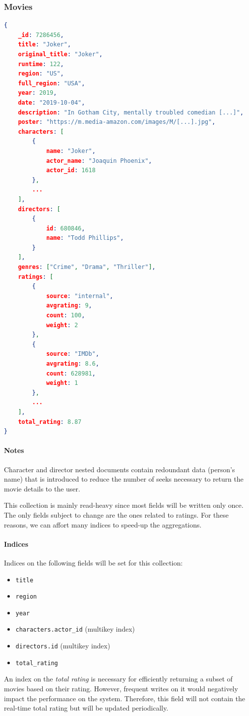 \documentclass[11pt]{article}
\begin{document}
\subsubsection{Movies}
\label{sec:movies}

\begin{lstlisting}[language=json]	
{
	_id: 7286456,
	title: "Joker",
	original_title: "Joker",
	runtime: 122,
	region: "US",
	full_region: "USA",
	year: 2019,
	date: "2019-10-04",
	description: "In Gotham City, mentally troubled comedian [...]",
	poster: "https://m.media-amazon.com/images/M/[...].jpg",
	characters: [
		{
			name: "Joker",
			actor_name: "Joaquin Phoenix",
			actor_id: 1618
		},
		...
	],
	directors: [
		{
			id: 680846,
			name: "Todd Phillips",
		}
	],
	genres: ["Crime", "Drama", "Thriller"],
	ratings: [
		{
			source: "internal",
			avgrating: 9,
			count: 100,
			weight: 2
		},
		{
			source: "IMDb",
			avgrating: 8.6,
			count: 628981,
			weight: 1
		},
		...
	],
	total_rating: 8.87
}
\end{lstlisting}

\paragraph{Notes}
Character and director nested documents contain redoundant data (person's name) that is introduced to reduce the number of seeks necessary to return the movie details
to the user.

This collection is mainly read-heavy since most fields will be written only once.
The only fields subject to change are the ones related to ratings. For these reasons,
we can affort many indices to speed-up the aggregations.

\paragraph{Indices} 
Indices on the following fields will be set for this collection:
\begin{itemize}
	\item \texttt{title}
	\item \texttt{region}
	\item \texttt{year}
	\item \texttt{characters.actor\_id} (multikey index)
	\item \texttt{directors.id} (multikey index)
	\item \texttt{total\_rating}
\end{itemize}

An index on the \emph{total rating} is necessary for efficiently returning a 
subset of movies based on their rating. However, frequent writes on it would 
negatively impact the performance on the system. Therefore, this field will 
not contain the real-time total rating but will be updated periodically.
\end{document}
